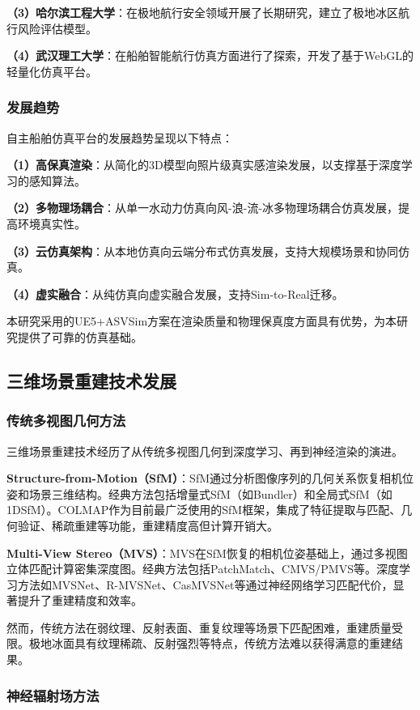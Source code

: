 \documentclass[12pt,a4paper]{ctexbook}
\begin{document}
\textbf{（3）哈尔滨工程大学}：在极地航行安全领域开展了长期研究，建立了极地冰区航行风险评估模型。

\textbf{（4）武汉理工大学}：在船舶智能航行仿真方面进行了探索，开发了基于WebGL的轻量化仿真平台。

\subsubsection{发展趋势}

自主船舶仿真平台的发展趋势呈现以下特点：

\textbf{（1）高保真渲染}：从简化的3D模型向照片级真实感渲染发展，以支撑基于深度学习的感知算法。

\textbf{（2）多物理场耦合}：从单一水动力仿真向风-浪-流-冰多物理场耦合仿真发展，提高环境真实性。

\textbf{（3）云仿真架构}：从本地仿真向云端分布式仿真发展，支持大规模场景和协同仿真。

\textbf{（4）虚实融合}：从纯仿真向虚实融合发展，支持Sim-to-Real迁移。

本研究采用的UE5+ASVSim方案在渲染质量和物理保真度方面具有优势，为本研究提供了可靠的仿真基础。

\subsection{三维场景重建技术发展}

\subsubsection{传统多视图几何方法}

三维场景重建技术经历了从传统多视图几何到深度学习、再到神经渲染的演进。

\textbf{Structure-from-Motion（SfM）}：SfM通过分析图像序列的几何关系恢复相机位姿和场景三维结构。经典方法包括增量式SfM（如Bundler）和全局式SfM（如1DSfM）。COLMAP作为目前最广泛使用的SfM框架，集成了特征提取与匹配、几何验证、稀疏重建等功能，重建精度高但计算开销大。

\textbf{Multi-View Stereo（MVS）}：MVS在SfM恢复的相机位姿基础上，通过多视图立体匹配计算密集深度图。经典方法包括PatchMatch、CMVS/PMVS等。深度学习方法如MVSNet、R-MVSNet、CasMVSNet等通过神经网络学习匹配代价，显著提升了重建精度和效率。

然而，传统方法在弱纹理、反射表面、重复纹理等场景下匹配困难，重建质量受限。极地冰面具有纹理稀疏、反射强烈等特点，传统方法难以获得满意的重建结果。

\subsubsection{神经辐射场方法}
\end{document}
